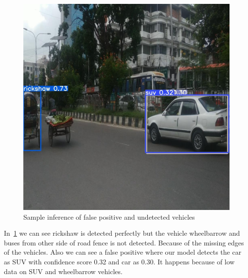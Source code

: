 \begin{figure}[h]
    \centering
    \includegraphics[max width=\textwidth]{images/ours/1.jpg}
   \caption[Sample Inference of Vehicles 3]{Sample inference of false positive and undetected vehicles}
    \label{fig:inference2354}
\end{figure}

In~\ref{fig:inference2354} we can see rickshaw is detected perfectly but the vehicle wheelbarrow and buses from other side of road fence is not detected. Because of the missing edges of the vehicles. Also we can see a false positive where our model detects the car as SUV with confidence score 0.32 and car as 0.30. It happens because of low data on SUV and wheelbarrow vehicles. 

\newpage

